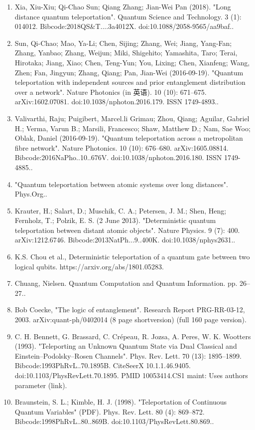 \begin{enumerate}
\item Xia, Xiu-Xiu; Qi-Chao Sun; Qiang Zhang; Jian-Wei Pan (2018). "Long distance quantum teleportation". Quantum Science and Technology. 3 (1): 014012. Bibcode:2018QS&T....3a4012X. doi:10.1088/2058-9565/aa9baf..
\item Sun, Qi-Chao; Mao, Ya-Li; Chen, Sijing; Zhang, Wei; Jiang, Yang-Fan; Zhang, Yanbao; Zhang, Weijun; Miki, Shigehito; Yamashita, Taro; Terai, Hirotaka; Jiang, Xiao; Chen, Teng-Yun; You, Lixing; Chen, Xianfeng; Wang, Zhen; Fan, Jingyun; Zhang, Qiang; Pan, Jian-Wei (2016-09-19). "Quantum teleportation with independent sources and prior entanglement distribution over a network". Nature Photonics (in 英语). 10 (10): 671–675. arXiv:1602.07081. doi:10.1038/nphoton.2016.179. ISSN 1749-4893..
\item Valivarthi, Raju; Puigibert, Marcel.li Grimau; Zhou, Qiang; Aguilar, Gabriel H.; Verma, Varun B.; Marsili, Francesco; Shaw, Matthew D.; Nam, Sae Woo; Oblak, Daniel (2016-09-19). "Quantum teleportation across a metropolitan fibre network". Nature Photonics. 10 (10): 676–680. arXiv:1605.08814. Bibcode:2016NaPho..10..676V. doi:10.1038/nphoton.2016.180. ISSN 1749-4885..
\item "Quantum teleportation between atomic systems over long distances". Phys.Org..
\item Krauter, H.; Salart, D.; Muschik, C. A.; Petersen, J. M.; Shen, Heng; Fernholz, T.; Polzik, E. S. (2 June 2013). "Deterministic quantum teleportation between distant atomic objects". Nature Physics. 9 (7): 400. arXiv:1212.6746. Bibcode:2013NatPh...9..400K. doi:10.1038/nphys2631..
\item K.S. Chou et al., Deterministic teleportation of a quantum gate between two logical qubits. https://arxiv.org/abs/1801.05283.
\item Chuang, Nielsen. Quantum Computation and Quantum Information. pp. 26–27..
\item Bob Coecke, "The logic of entanglement". Research Report PRG-RR-03-12, 2003. arXiv:quant-ph/0402014 (8 page shortversion) (full 160 page version).
\item C. H. Bennett, G. Brassard, C. Crépeau, R. Jozsa, A. Peres, W. K. Wootters (1993). "Teleporting an Unknown Quantum State via Dual Classical and Einstein–Podolsky–Rosen Channels". Phys. Rev. Lett. 70 (13): 1895–1899. Bibcode:1993PhRvL..70.1895B. CiteSeerX 10.1.1.46.9405. doi:10.1103/PhysRevLett.70.1895. PMID 10053414.CS1 maint: Uses authors parameter (link).
\item Braunstein, S. L.; Kimble, H. J. (1998). "Teleportation of Continuous Quantum Variables" (PDF). Phys. Rev. Lett. 80 (4): 869–872. Bibcode:1998PhRvL..80..869B. doi:10.1103/PhysRevLett.80.869..

\end{enumerate}
